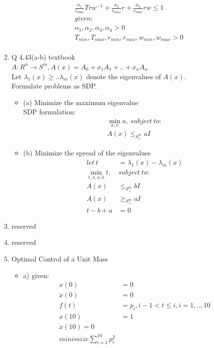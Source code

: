 \documentclass[12pt,letter]{article}
\begin{document}
\begin{enumerate}
\begin{align*}
    \frac{\alpha_1}{c_{max}} T rw^{-1} + \frac{\alpha_2}{c_{max}} r + \frac{\alpha_3}{c_{max}} r w \leq 1\\
    given:\\
    \alpha_1,\alpha_2,\alpha_3,\alpha_4 > 0\\
    T_{min}, T_{max}, r_{min}, r_{max}, w_{min}, w_{max} > 0\\
  \end{align*}
\item Q 4.43(a-b) textbook\\
  $A:R^n \to S^m, A(x) = A_0 + x_1A_1 + .. + x_n A_n$\\
  Let $\lambda_1(x) \geq ..  \lambda_m(x)$ denote the eigenvalues of $A(x)$.\\
  Formulate problems as SDP.\\
  \begin{itemize}
  \item (a) Minimize the maximum eigenvalue\\
    SDP formulation:
    \begin{align*}
      \min_{a,x} a,\ subject\ to:\\
      A(x) \leq_{S_+^m} aI 
    \end{align*}
  \item (b) Minimize the spread of the eigenvalues
    \begin{align*}
      let\ t &= \lambda_1(x) - \lambda_m(x)\\
      \min_{t,x,a,b} t,\ & subject\ to:\\
      A(x) & \leq_{S_+^m} bI \\
      A(x) & \geq_{S_+^m} aI \\
      t - b + a & = 0
    \end{align*}
  \end{itemize}
\item reserved
\item reserved
\item Optimal Control of a Unit Mass
  \begin{itemize}
  \item a) given:
    \begin{align*}
      x(0)&=0\\
      \dot{x}(0)&=0\\
      f(t)&=p_i, i-1 < t \leq i, i=1,..,10\\
      x(10)&=1\\
      \dot{x}(10)=0\\
      minimize \sum_{i=1}^{10} p_i^2
    \end{align*}

\end{itemize}
\end{enumerate}
\end{document}
